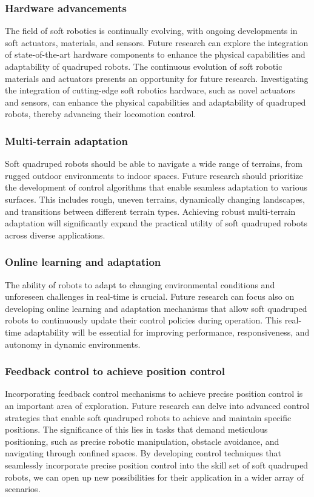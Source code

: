 \subsubsection*{Hardware advancements}
The field of soft robotics is continually evolving, with ongoing developments in soft actuators, materials, and sensors. Future research can explore the integration of state-of-the-art hardware components to enhance the physical capabilities and adaptability of quadruped robots. The continuous evolution of soft robotic materials and actuators presents an opportunity for future research. Investigating the integration of cutting-edge soft robotics hardware, such as novel actuators and sensors\cite{tanShapeEstimation3D2022,tanEdgeEnabledAdaptiveShape2024}, can enhance the physical capabilities and adaptability of quadruped robots, thereby advancing their locomotion control.

\subsubsection*{Multi-terrain adaptation}
Soft quadruped robots should be able to navigate a wide range of terrains, from rugged outdoor environments to indoor spaces. Future research should prioritize the development of control algorithms that enable seamless adaptation to various surfaces. This includes rough, uneven terrains, dynamically changing landscapes, and transitions between different terrain types. Achieving robust multi-terrain adaptation will significantly expand the practical utility of soft quadruped robots across diverse applications.

\subsubsection*{Online learning and adaptation}
The ability of robots to adapt to changing environmental conditions and unforeseen challenges in real-time is crucial. Future research can focus also on developing online learning and adaptation mechanisms that allow soft quadruped robots to continuously update their control policies during operation. This real-time adaptability will be essential for improving performance, responsiveness, and autonomy in dynamic environments.

\subsubsection*{Feedback control to achieve position control}
Incorporating feedback control mechanisms to achieve precise position control is an important area of exploration. Future research can delve into advanced control strategies that enable soft quadruped robots to achieve and maintain specific positions. The significance of this lies in tasks that demand meticulous positioning, such as precise robotic manipulation, obstacle avoidance, and navigating through confined spaces. By developing control techniques that seamlessly incorporate precise position control into the skill set of soft quadruped robots, we can open up new possibilities for their application in a wider array of scenarios.

